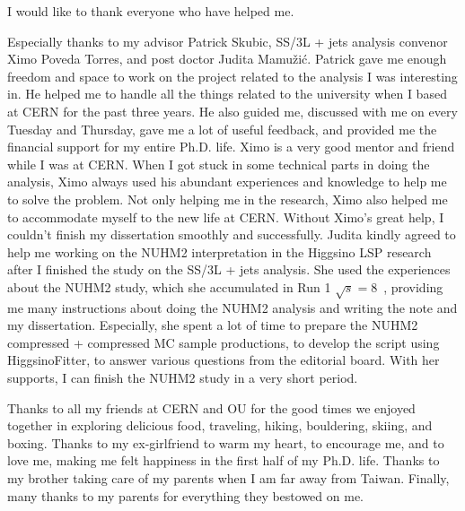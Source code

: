 I would like to thank everyone who have helped me.

Especially thanks to my advisor Patrick Skubic, SS/3L + jets analysis convenor Ximo Poveda Torres, and post doctor Judita Mamu\v{z}i\'{c}.
%
Patrick gave me enough freedom and space to work on the project related to the analysis I was interesting in.
He helped me to handle all the things related to the university when I based at CERN for the past three years.
He also guided me, discussed with me on every Tuesday and Thursday, gave me a lot of useful feedback, and provided me the financial support for my entire Ph.D. life.
%
Ximo is a very good mentor and friend while I was at CERN.
When I got stuck in some technical parts in doing the analysis, Ximo always used his abundant experiences and knowledge to help me to solve the problem.
Not only helping me in the research, Ximo also helped me to accommodate myself to the new life at CERN.
Without Ximo's great help, I couldn't finish my dissertation smoothly and successfully.
%
Judita kindly agreed to help me working on the NUHM2 interpretation in the Higgsino LSP research after I finished the study on the SS/3L + jets analysis.
She used the experiences about the NUHM2 study, which she accumulated in Run 1 $\sqrt{s} = 8$~{\TeV}, providing me many instructions about doing the NUHM2 analysis and writing the note and my dissertation.
Especially, she spent a lot of time to prepare the NUHM2 compressed + compressed MC sample productions, to develop the script using HiggsinoFitter, to answer various questions from the editorial board.
With her supports, I can finish the NUHM2 study in a very short period.
%

Thanks to all my friends at CERN and OU for the good times we enjoyed together in exploring delicious food, traveling, hiking, bouldering, skiing, and boxing.
Thanks to my ex-girlfriend to warm my heart, to encourage me, and to love me, making me felt happiness in the first half of my Ph.D. life.
Thanks to my brother taking care of my parents when I am far away from Taiwan.
Finally, many thanks to my parents for everything they bestowed on me.


